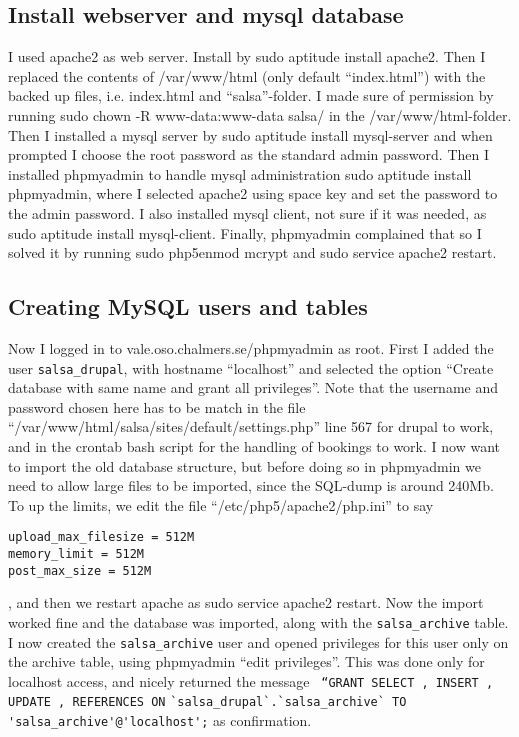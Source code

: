 \subsection{Install webserver and mysql database}
I used apache2 as web server. Install by sudo aptitude install apache2. Then I
replaced the contents of  /var/www/html (only default “index.html”) with the
backed up files, i.e. index.html and “salsa”-folder. I made sure of permission
by running sudo chown -R www-data:www-data salsa/ in the /var/www/html-folder.
Then I installed a mysql server by sudo aptitude install mysql-server and when
prompted I choose the root password as the standard admin password. Then
I installed phpmyadmin to handle mysql administration sudo aptitude install
phpmyadmin, where I selected apache2 using space key and set the password to
the admin password. I also installed mysql client, not sure if it was
needed, as sudo aptitude install mysql-client. Finally, phpmyadmin complained
that so I solved it by running sudo php5enmod mcrypt and sudo service apache2
restart.  
\subsection{Creating MySQL users and tables}
Now I logged in to vale.oso.chalmers.se/phpmyadmin as root. First I added the
user \verb!salsa_drupal!, with hostname “localhost” and selected the option “Create
database with same name and grant all privileges”. Note that the username and
password chosen here has to be match in the file
“/var/www/html/salsa/sites/default/settings.php” line 567 for drupal to work,
and in the crontab bash script for the handling of bookings to work. I now want
to import the old database structure, but before doing so in phpmyadmin we need
to allow large files to be imported, since the SQL-dump is around 240Mb. To up
the limits, we edit the file “/etc/php5/apache2/php.ini” to say
\begin{verbatim}
upload_max_filesize = 512M
memory_limit = 512M
post_max_size = 512M
\end{verbatim}
, and then we restart apache as sudo service apache2 restart. Now the import
worked fine and the database was imported, along with the \verb!salsa_archive!
table. I now created the \verb!salsa_archive! user and opened privileges for this user
only on the archive table, using phpmyadmin “edit privileges”. This was
done only for localhost access, and nicely returned the message 
\verb! “GRANT SELECT , INSERT , UPDATE , REFERENCES ON! \newline
\verb!`salsa_drupal`.`salsa_archive` TO 'salsa_archive'@'localhost';! 
as confirmation.  
